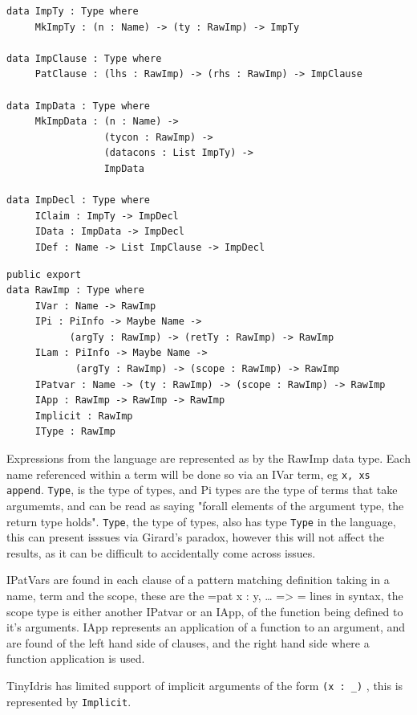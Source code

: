 \documentclass[a4paper]{article}
\begin{document}
\begin{center}
\begin{verbatim}
data ImpTy : Type where
	 MkImpTy : (n : Name) -> (ty : RawImp) -> ImpTy

data ImpClause : Type where
	 PatClause : (lhs : RawImp) -> (rhs : RawImp) -> ImpClause

data ImpData : Type where
	 MkImpData : (n : Name) -> 
				 (tycon : RawImp) ->
				 (datacons : List ImpTy) ->
				 ImpData

data ImpDecl : Type where
	 IClaim : ImpTy -> ImpDecl
	 IData : ImpData -> ImpDecl
	 IDef : Name -> List ImpClause -> ImpDecl
\end{verbatim}
\end{center}

\begin{center}
\begin{verbatim}
public export
data RawImp : Type where
	 IVar : Name -> RawImp
	 IPi : PiInfo -> Maybe Name ->
		   (argTy : RawImp) -> (retTy : RawImp) -> RawImp
	 ILam : PiInfo -> Maybe Name ->
			(argTy : RawImp) -> (scope : RawImp) -> RawImp
	 IPatvar : Name -> (ty : RawImp) -> (scope : RawImp) -> RawImp
	 IApp : RawImp -> RawImp -> RawImp
	 Implicit : RawImp
	 IType : RawImp
\end{verbatim}
\end{center}

Expressions from the language are represented as by the RawImp data type.
Each name referenced within a term will be done so via an IVar term, eg
\texttt{x, xs append}. \texttt{Type}, is the type of types, and Pi types are the type
of terms that take argumemts, and can be read as saying "forall elements
of the argument type, the return type holds". \texttt{Type}, the type of types,
also has type \texttt{Type} in the language, this can present isssues via 
Girard's paradox, however this will not affect the results, as it can
be difficult to accidentally come across issues.  

IPatVars are found in each clause of a pattern matching definition 
taking in a name, term and the scope, these are the 
=pat x : y, \ldots{} => = lines in syntax, the scope type is either another
IPatvar or an IApp, of the function being defined to it's arguments.
IApp represents an application of a function to an argument, and are 
found of the left hand side of clauses, and the right hand side where 
a function application is used.

TinyIdris has limited support of implicit arguments of the form
 \texttt{(x : \_)} , this is represented by \texttt{Implicit}.
\end{document}

